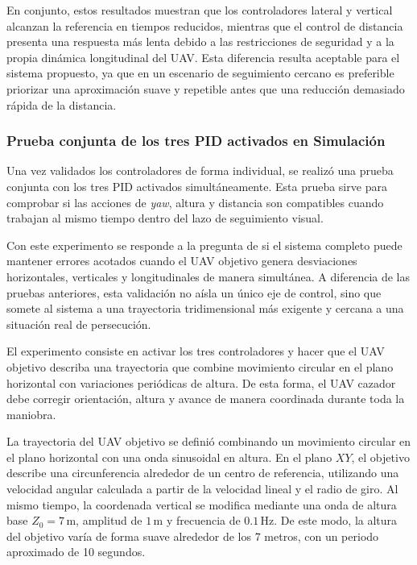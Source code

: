 \vspace{0.3cm}

En conjunto, estos resultados muestran que los controladores lateral y vertical alcanzan la referencia en tiempos reducidos, mientras que el control de distancia presenta una respuesta más lenta debido a las restricciones de seguridad y a la propia dinámica longitudinal del UAV. Esta diferencia resulta aceptable para el sistema propuesto, ya que en un escenario de seguimiento cercano es preferible priorizar una aproximación suave y repetible antes que una reducción demasiado rápida de la distancia.

\subsubsection{Prueba conjunta de los tres PID activados en Simulación}

Una vez validados los controladores de forma individual, se realizó una prueba conjunta con los tres PID activados simultáneamente. Esta prueba sirve para comprobar si las acciones de \textit{yaw}, altura y distancia son compatibles cuando trabajan al mismo tiempo dentro del lazo de seguimiento visual.

\vspace{0.3cm}

Con este experimento se responde a la pregunta de si el sistema completo puede mantener errores acotados cuando el UAV objetivo genera desviaciones horizontales, verticales y longitudinales de manera simultánea. A diferencia de las pruebas anteriores, esta validación no aísla un único eje de control, sino que somete al sistema a una trayectoria tridimensional más exigente y cercana a una situación real de persecución.

\vspace{0.3cm}

El experimento consiste en activar los tres controladores y hacer que el UAV objetivo describa una trayectoria que combine movimiento circular en el plano horizontal con variaciones periódicas de altura. De esta forma, el UAV cazador debe corregir orientación, altura y avance de manera coordinada durante toda la maniobra.

\vspace{0.3cm}

La trayectoria del UAV objetivo se definió combinando un movimiento circular en el plano horizontal con una onda sinusoidal en altura. En el plano $XY$, el objetivo describe una circunferencia alrededor de un centro de referencia, utilizando una velocidad angular calculada a partir de la velocidad lineal y el radio de giro. Al mismo tiempo, la coordenada vertical se modifica mediante una onda de altura base $Z_0 = 7\,\mathrm{m}$, amplitud de $1\,\mathrm{m}$ y frecuencia de $0.1\,\mathrm{Hz}$. De este modo, la altura del objetivo varía de forma suave alrededor de los 7 metros, con un periodo aproximado de 10 segundos.

